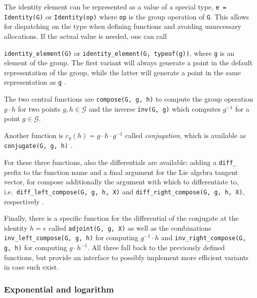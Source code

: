 \documentclass{juliacon}
\newcommand{\term}[1]{\emph{#1}}
\begin{document}
The identity element can be represented as a value of a special type, \verb|e = Identity(G)| or \verb|Identity(op)| where \verb|op| is the group operation of \verb|G|. This allows for dispatching on the type when defining functions and avoiding unnecessary allocations. If the actual value is needed, one can call

\verb|identity_element(G)| or \verb|identity_element(G, typeof(g))|, where \verb|g| is an element of the group. The first variant will always generate a point in the default representation of the group, while the latter will generate a point in the same representation as \verb|g|%
.

The two central functions are \verb|compose(G, g, h)|
to compute the group operation \(g \cdot h\) for two points \(g, h \in \mathcal{G}\) and the inverse \verb|inv(G, g)|
which computes \(g^{-1}\) for a point \(g \in \mathcal{G}\).

Another function is $c_g(h) = g \cdot h \cdot g^{-1}$ called \term{conjugation}, which is available as \verb|conjugate(G, g, h)|%
.

For these three functions, also the differentials are available: adding a \verb|diff_| prefix to the function name and a final argument for the Lie algebra tangent vector, for compose additionally the argument with which to  differentiate to, i.e.\ \verb|diff_left_compose(G, g, h, X)| and \verb|diff_right_compose(G, g, h, X)|, respectively%
.

Finally, there is a specific function for the differential of the conjugate at the identity $h=e$ called \verb|adjoint(G, g, X)|
as well as the combinations \verb|inv_left_compose(G, g, h)|
for computing $g^{-1}\cdot h$ and \verb|inv_right_compose(G, g, h)|
for computing $g \cdot h^{-1}$. All three fall back to the previously defined functions, but provide an interface to possibly implement more efficient variants in case such exist.

\subsubsection*{Exponential and logarithm}
\end{document}
